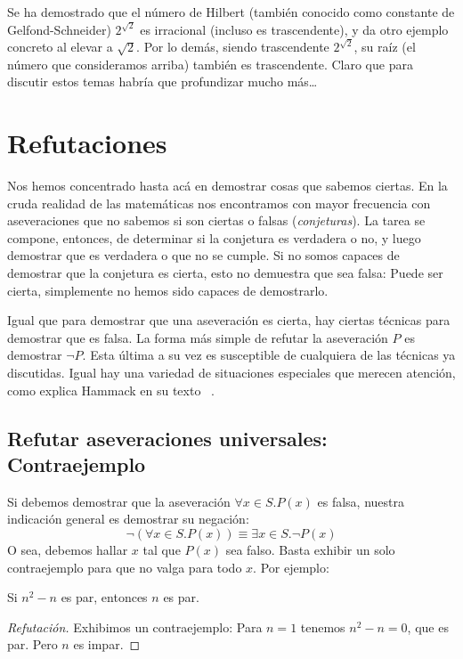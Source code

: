   Se ha demostrado
  que el número de Hilbert%
  (también conocido como constante de Gelfond-Schneider)%
  \(2^{\sqrt{2}}\) es irracional
  (incluso es trascendente),
  y da otro ejemplo concreto al elevar a \(\sqrt{2}\).
  Por lo demás,
  siendo trascendente \(2^{\sqrt{2}}\),
  su raíz
  (el número que consideramos arriba)
  también es trascendente.
  Claro que para discutir estos temas habría que profundizar mucho más\ldots

\section{Refutaciones}
\label{sec:refutaciones}

  Nos hemos concentrado hasta acá
  en demostrar cosas que sabemos ciertas.
  En la cruda realidad
  de las matemáticas nos encontramos con mayor frecuencia
  con aseveraciones que no sabemos si son ciertas o falsas
  (\emph{conjeturas}).%
  La tarea se compone,
  entonces,
  de determinar si la conjetura es verdadera o no,
  y luego demostrar que es verdadera
  o que no se cumple.
  Si no somos capaces de demostrar que la conjetura es cierta,
  esto no demuestra que sea falsa:
  Puede ser cierta,
  simplemente no hemos sido capaces de demostrarlo.

  Igual que para demostrar que una aseveración es cierta,
  hay ciertas técnicas para demostrar que es falsa.
  La forma más simple de refutar la aseveración \(P\)
  es demostrar \(\neg P\).
  Esta última a su vez es susceptible
  de cualquiera de las técnicas ya discutidas.
  Igual hay una variedad de situaciones especiales
  que merecen atención,
  como explica Hammack en su texto~%
    \cite{hammack13:_book_proof}.

\subsection{Refutar aseveraciones universales: Contraejemplo}
\label{sec:refutar-universal}

  Si debemos demostrar
  que la aseveración \(\forall x \in S. P(x)\) es falsa,
  nuestra indicación general es demostrar su negación:
  \begin{equation*}
    \neg (\forall x \in S. P(x))
      \equiv \exists x \in S. \neg P(x)
  \end{equation*}
  O sea,
  debemos hallar \(x\) tal que \(P(x)\) sea falso.
  Basta exhibir un solo contraejemplo
  para que no valga para todo \(x\).
  Por ejemplo:
  \begin{conjecture}
    Si \(n^2 - n\) es par,
    entonces \(n\) es par.
  \end{conjecture}
  \begin{proof}[Refutación]
    Exhibimos un contraejemplo:
    Para \(n = 1\) tenemos \(n^2 - n = 0\),
    que es par.
    Pero \(n\) es impar.
  \end{proof}

